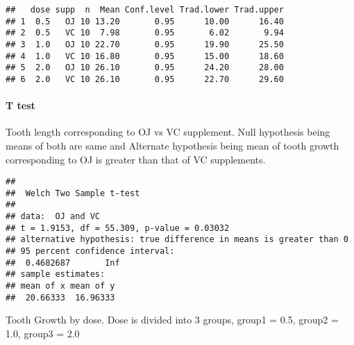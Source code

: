 \documentclass[]{article}
\newenvironment{Shaded}{\begin{snugshade}}{\end{snugshade}}
\newcommand{\KeywordTok}[1]{\textcolor[rgb]{0.13,0.29,0.53}{\textbf{#1}}}
\newcommand{\DataTypeTok}[1]{\textcolor[rgb]{0.13,0.29,0.53}{#1}}
\newcommand{\FloatTok}[1]{\textcolor[rgb]{0.00,0.00,0.81}{#1}}
\newcommand{\StringTok}[1]{\textcolor[rgb]{0.31,0.60,0.02}{#1}}
\newcommand{\OtherTok}[1]{\textcolor[rgb]{0.56,0.35,0.01}{#1}}
\newcommand{\OperatorTok}[1]{\textcolor[rgb]{0.81,0.36,0.00}{\textbf{#1}}}
\newcommand{\NormalTok}[1]{#1}
\let\oldparagraph\paragraph
\renewcommand{\paragraph}[1]{\oldparagraph{#1}\mbox{}}
\begin{document}
\begin{verbatim}
##   dose supp  n  Mean Conf.level Trad.lower Trad.upper
## 1  0.5   OJ 10 13.20       0.95      10.00      16.40
## 2  0.5   VC 10  7.98       0.95       6.02       9.94
## 3  1.0   OJ 10 22.70       0.95      19.90      25.50
## 4  1.0   VC 10 16.80       0.95      15.00      18.60
## 5  2.0   OJ 10 26.10       0.95      24.20      28.00
## 6  2.0   VC 10 26.10       0.95      22.70      29.60
\end{verbatim}

\paragraph{T test}\label{t-test}

Tooth length corresponding to OJ vs VC supplement. Null hypothesis being
means of both are same and Alternate hypothesis being mean of tooth
growth corresponding to OJ is greater than that of VC supplements.

\begin{Shaded}
\end{Shaded}

\begin{verbatim}
## 
##  Welch Two Sample t-test
## 
## data:  OJ and VC
## t = 1.9153, df = 55.309, p-value = 0.03032
## alternative hypothesis: true difference in means is greater than 0
## 95 percent confidence interval:
##  0.4682687       Inf
## sample estimates:
## mean of x mean of y 
##  20.66333  16.96333
\end{verbatim}

Tooth Growth by dose. Dose is divided into 3 groups, group1 = 0.5,
group2 = 1.0, group3 = 2.0
\end{document}
